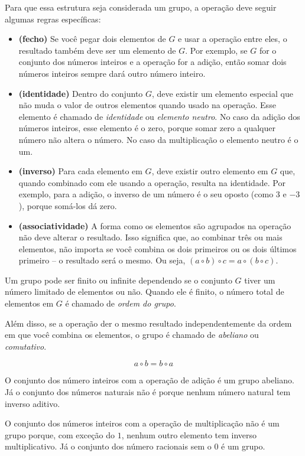 Para que essa estrutura seja considerada um grupo, a operação deve seguir algumas regras específicas:
\begin{itemize}
\item[] {\bf (fecho)} Se você pegar dois elementos de $G$ e usar a operação entre eles, o resultado também deve ser um elemento de $G$.
  Por exemplo, se $G$ for o conjunto dos números inteiros e a operação for a adição, então somar dois números inteiros sempre dará outro número inteiro.
\item[] {\bf (identidade)} Dentro do conjunto $G$, deve existir um elemento especial que não muda o valor de outros elementos quando usado na operação.
  Esse elemento é chamado de {\em identidade} ou {\em elemento neutro}.
  No caso da adição dos números inteiros, esse elemento é o zero, porque somar zero a qualquer número não altera o número.
  No caso da multiplicação o elemento neutro é o um.
\item[] {\bf (inverso)} Para cada elemento em $G$, deve existir outro elemento em $G$ que, quando combinado com ele usando a operação, resulta na identidade.
  Por exemplo, para a adição, o inverso de um número é o seu oposto (como $3$ e $-3$), porque somá-los dá zero.
\item[] {\bf (associatividade)} A forma como os elementos são agrupados na operação não deve alterar o resultado. Isso significa que, ao combinar três ou mais elementos, não importa se você combina os dois primeiros ou os dois últimos primeiro – o resultado será o mesmo.
  Ou seja, $(a \circ b) \circ c = a \circ (b \circ c)$.
\end{itemize}

Um grupo pode ser finito ou infinite dependendo se o conjunto $G$ tiver um número limitado de elementos ou não.
Quando ele é finito, o número total de elementos em $G$ é chamado de {\em ordem do grupo}.

Além disso, se a operação der o mesmo resultado independentemente da ordem em que você combina os elementos, o grupo é chamado de {\em abeliano} ou {\em comutativo}.

\begin{displaymath}
  a \circ b = b \circ a
\end{displaymath}

O conjunto dos número inteiros com a operação de adição é um grupo abeliano.
Já o conjunto dos números naturais não é porque nenhum número natural tem inverso aditivo.

O conjunto dos números inteiros com a operação de multiplicação não é um grupo porque, com exceção do $1$, nenhum outro elemento tem inverso multiplicativo.
Já o conjunto dos número racionais sem o $0$ é um grupo.

